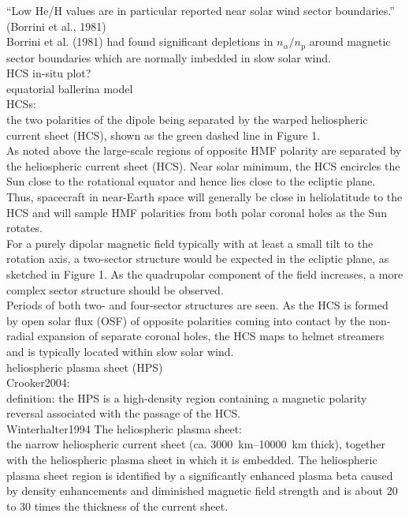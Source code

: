 ``Low He/H values are in particular reported near solar wind sector boundaries.'' (Borrini et al., 1981)\\
Borrini et al. (1981) had found significant depletions in $n_\alpha/n_\text{p}$ around magnetic sector boundaries which are normally imbedded in slow solar wind.\\

HCS in-situ plot?\\

equatorial ballerina model\\


\citet{Owens2013} HCSs:\\
the two polarities of the dipole being separated by the warped heliospheric current sheet (HCS), shown as the green dashed line in Figure 1.\\
As noted above the large-scale regions of opposite HMF polarity are separated by the heliospheric current sheet (HCS). Near solar minimum, the HCS encircles the Sun close to the rotational equator and hence lies close to the ecliptic plane. Thus, spacecraft in near-Earth space will generally be close in heliolatitude to the HCS and will sample HMF polarities from both polar coronal holes as the Sun rotates.\\
For a purely dipolar magnetic field typically with at least a small tilt to the rotation axis, a two-sector structure would be expected in the ecliptic plane, as sketched in Figure 1. As the quadrupolar component of the field increases, a more complex sector structure should be observed.\\
Periods of both two- and four-sector structures are seen. As the HCS is formed by open solar flux (OSF) of opposite polarities coming into contact by the non-radial expansion of separate coronal holes, the HCS maps to helmet streamers and is typically located within slow solar wind.\\


heliospheric plasma sheet (HPS)\\

Crooker2004:\\
definition: the HPS is a high-density region containing a magnetic polarity reversal associated with the passage of the HCS.\\

Winterhalter1994 The heliospheric plasma sheet:\\
the narrow heliospheric current sheet (ca. \SIrange{3000}{10000}{\km} thick), together with the heliospheric plasma sheet in which it is embedded. The heliospheric plasma sheet region is identified by a significantly enhanced plasma beta caused by density enhancements and diminished magnetic field strength and is about 20 to 30 times the thickness of the current sheet.\\

